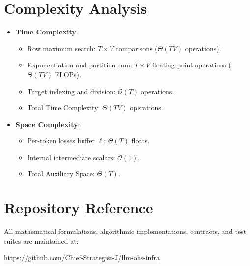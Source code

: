 \documentclass[11pt,a4paper]{article}
\theoremstyle{definition}
\begin{document}
\section{Complexity Analysis}
\begin{itemize}
    \item \textbf{Time Complexity}:
    \begin{itemize}
        \item Row maximum search: $T \times V$ comparisons ($\Theta(TV)$ operations).
        \item Exponentiation and partition sum: $T \times V$ floating-point operations ($\Theta(TV)$ FLOPs).
        \item Target indexing and division: $\mathcal{O}(T)$ operations.
        \item Total Time Complexity: $\Theta(T V)$ operations.
    \end{itemize}
    \item \textbf{Space Complexity}:
    \begin{itemize}
        \item Per-token losses buffer $\boldsymbol{\ell}$: $\Theta(T)$ floats.
        \item Internal intermediate scalars: $\mathcal{O}(1)$.
        \item Total Auxiliary Space: $\Theta(T)$.
    \end{itemize}
\end{itemize}

\section{Repository Reference}
All mathematical formulations, algorithmic implementations, contracts, and test suites are maintained at:
\begin{center}
\url{https://github.com/Chief-Strategist-J/llm-obs-infra}
\end{center}
\end{document}
